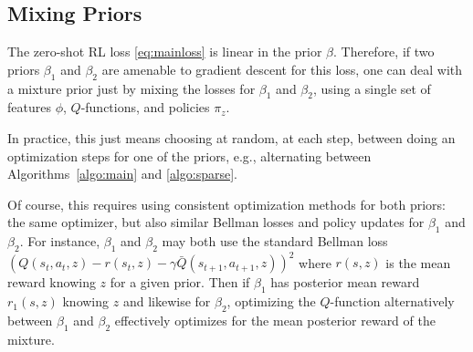 \documentclass[11pt,a4paper]{article}
\begin{document}
% 
% 
% 
% 
% 
% 

\subsection{Mixing Priors}
\label{sec:mixing}

The zero-shot RL loss \eqref{eq:mainloss} is linear in the prior $\beta$.
Therefore, if two priors $\beta_1$ and $\beta_2$ are amenable to gradient
descent for this loss, one can deal with a mixture prior just by mixing
the losses for $\beta_1$ and $\beta_2$,
using a single set of features $\phi$, $Q$-functions, and
policies $\pi_z$.

In practice, this just means choosing at random, at each step, between
doing an optimization steps for one of the priors, e.g., alternating
between Algorithms~\ref{algo:main} and \ref{algo:sparse}.

Of course, this requires using consistent optimization methods for both
priors: the same optimizer, but also similar Bellman losses and policy
updates for $\beta_1$ and $\beta_2$. For instance, $\beta_1$ and
$\beta_2$ may both use the standard Bellman loss
$\left(Q(s_t,a_t,z)-r(s_t,z)-\gamma \bar Q(s_{t+1},a_{t+1},z)\right)^2$
where $r(s,z)$ is the mean reward knowing $z$ for a given prior. Then if
$\beta_1$ has posterior mean reward $r_1(s,z)$ knowing $z$ and likewise
for $\beta_2$, optimizing the $Q$-function alternatively between
$\beta_1$ and $\beta_2$ effectively optimizes for the mean posterior
reward of the mixture.
\end{document}

